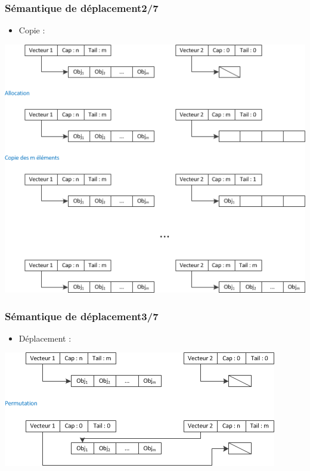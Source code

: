 \documentclass[C++.tex]{subfiles}
\begin{document}
\begin{frame}
	\frametitle{Sémantique de déplacement\titlehfill{}2/7}
	\begin{itemize}
		\item Copie :
	\end{itemize}

	\begin{center}
		\includegraphics[height=0.7\textheight]{input_src/copie.png}
	\end{center}
\end{frame}

\begin{frame}
	\frametitle{Sémantique de déplacement\titlehfill{}3/7}
	\begin{itemize}
		\item Déplacement :
	\end{itemize}

	\begin{center}
		\includegraphics[height=0.4\textheight]{input_src/deplacement.png}
	\end{center}
\end{frame}
\end{document}
